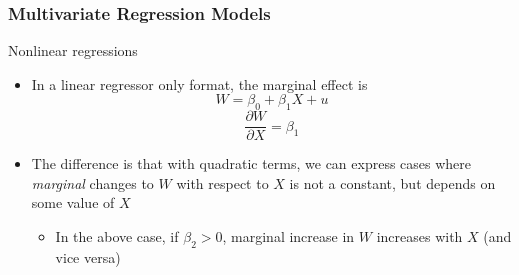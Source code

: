 \documentclass[compress]{beamer}
\begin{document}
\begin{frame}
\frametitle{Multivariate Regression Models}
Nonlinear regressions
\begin{itemize}
 \item In a linear regressor only format, the marginal effect is
 \[
W = \beta_0 + \beta_1 X+u
\]
\[
\frac{\partial W}{\partial X}=\beta_1
\]
\item The difference is that with quadratic terms, we can express cases where \textit{marginal} changes to $W$ with respect to $X$ is not a constant, but depends on some value of $X$
\begin{itemize}
\item In the above case, if $\beta_2>0$, marginal increase in $W$ increases with $X$ (and vice versa)
\end{itemize}
\end{itemize}
\end{frame}
\end{document}
